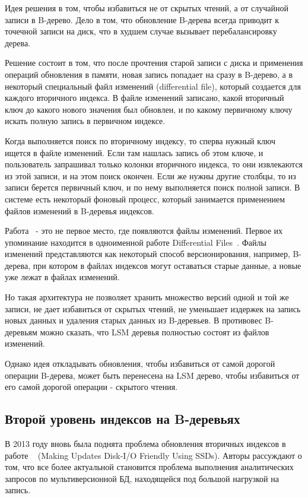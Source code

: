 \documentclass[a4paper,hidelinks,12pt]{article}
\begin{document}
Идея решения в том, чтобы избавиться не от скрытых чтений, а от случайной записи
в B-дерево. Дело в том, что обновление B-дерева всегда приводит к точечной
записи на диск, что в худшем случае вызывает перебалансировку дерева.

Решение состоит в том, что после прочтения старой записи с диска и применения
операций обновления в памяти, новая запись попадает на сразу в B-дерево, а в
некоторый специальный файл изменений (differential file), который создается для
каждого вторичного индекса. В файле изменений записано, какой вторичный ключ до
какого нового значения был обновлен, и по какому первичному ключу искать полную
запись в первичном индексе.

Когда выполняется поиск по вторичному индексу, то сперва нужный ключ ищется в
файле изменений. Если там нашлась запись об этом ключе, и пользователь
запрашивал только колонки вторичного индекса, то они извлекаются из этой записи,
и на этом поиск окончен. Если же нужны другие столбцы, то из записи берется
первичный ключ, и по нему выполняется поиск полной записи. В системе есть
некоторый фоновый процесс, который занимается применением файлов изменений в
B-деревья индексов.

Работа~\cite{btree_update_def} - это не первое место, где появляются файлы
изменений. Первое их упоминание находится в одноименной работе Differential
Files~\cite{differential_files}. Файлы изменений представляются как некоторый
способ версионирования, например, B-дерева, при котором в файлах индексов могут
оставаться старые данные, а новые уже лежат в файлах изменений.

Но такая архитектура не позволяет хранить множество версий одной и той же
записи, не дает избавиться от скрытых чтений, не уменьшает издержек на запись
новых данных и удаления старых данных из B-деревьев. В противовес B-деревьям
можно сказать, что LSM деревья полностью состоят из файлов изменений.

Однако идея откладывать обновления, чтобы избавиться от самой дорогой операции
B-дерева, может быть перенесена на LSM дерево, чтобы избавиться от его самой
дорогой операции - скрытого чтения.

\subsection{Второй уровень индексов на B-деревьях}
В 2013 году вновь была поднята проблема обновления вторичных индексов в работе
~\cite{ssd_friendly} (Making Updates Disk-I/O Friendly Using SSDs). Авторы
рассуждают о том, что все более актуальной становится проблема выполнения
аналитических запросов по мультиверсионной БД, находящейся под большой нагрузкой
на запись.
\end{document}
